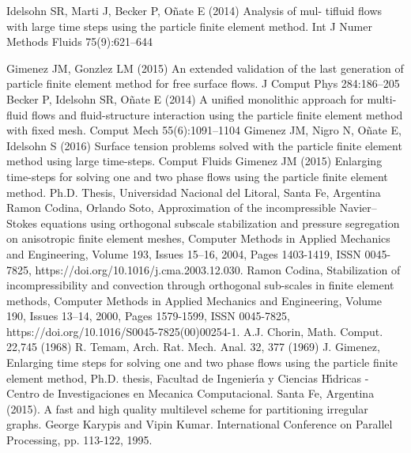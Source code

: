  Idelsohn SR, Marti J, Becker P, Oñate E (2014) Analysis of mul-
tifluid flows with large time steps using the particle finite element
method. Int J Numer Methods Fluids 75(9):621–644

 Gimenez JM, Gonzlez LM (2015) An extended validation of the
last generation of particle finite element method for free surface
flows. J Comput Phys 284:186–205
 Becker P, Idelsohn SR, Oñate E (2014) A unified monolithic
approach for multi-fluid flows and fluid-structure interaction using
the particle finite element method with fixed mesh. Comput Mech
55(6):1091–1104
 Gimenez JM, Nigro N, Oñate E, Idelsohn S (2016) Surface tension
problems solved with the particle finite element method using large
time-steps. Comput Fluids
 Gimenez JM (2015) Enlarging time-steps for solving one and two
phase flows using the particle finite element method. Ph.D. Thesis,
Universidad Nacional del Litoral, Santa Fe, Argentina
 Ramon Codina, Orlando Soto,
Approximation of the incompressible Navier–Stokes equations using orthogonal subscale stabilization and pressure segregation on anisotropic finite element meshes,
Computer Methods in Applied Mechanics and Engineering,
Volume 193, Issues 15–16,
2004,
Pages 1403-1419,
ISSN 0045-7825,
https://doi.org/10.1016/j.cma.2003.12.030.
 Ramon Codina,
Stabilization of incompressibility and convection through orthogonal sub-scales in finite element methods,
Computer Methods in Applied Mechanics and Engineering,
Volume 190, Issues 13–14,
2000,
Pages 1579-1599,
ISSN 0045-7825,
https://doi.org/10.1016/S0045-7825(00)00254-1.
A.J. Chorin, Math. Comput. 22,745 (1968)
R. Temam, Arch. Rat. Mech. Anal. 32, 377 (1969)
  J. Gimenez, Enlarging time steps for solving one and two phase flows using the particle finite element
 method, Ph.D. thesis, Facultad de Ingenier\'{\i}a y Ciencias H\'{\i}dricas - Centro de Investigaciones en Mecanica
 Computacional. Santa Fe, Argentina (2015).
 A fast and high quality multilevel scheme for partitioning irregular graphs.
George Karypis and Vipin Kumar. International Conference on Parallel Processing, pp. 113-122, 1995.
